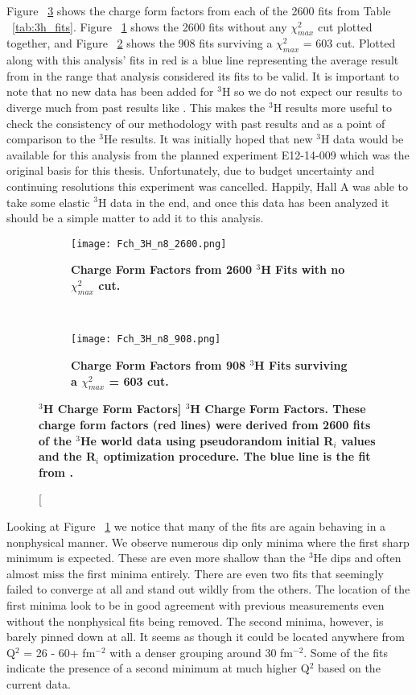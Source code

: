Figure ~\ref{fig:3h_fch} shows the charge form factors from each of the 2600 fits from Table ~\ref{tab:3h_fits}. Figure ~\ref{fig:3h_fch_no_cut} shows the 2600 fits without any $\chi^2_{max}$ cut plotted together, and Figure ~\ref{fig:3h_fch_cut} shows the 908 fits surviving a $\chi^2_{max}$ = 603 cut. Plotted along with this analysis' fits in red is a blue line representing the average result from \cite{Article:Amroun} in the range that analysis considered its fits to be valid. It is important to note that no new data has been added for $^3$H so we do not expect our results to diverge much from past results like \cite{Article:Amroun}. This makes the $^3$H results more useful to check the consistency of our methodology with past results and as a point of comparison to the $^3$He results. It was initially hoped that new $^3$H data would be available for this analysis from the planned experiment E12-14-009 \cite{3h_proposal} which was the original basis for this thesis. Unfortunately, due to budget uncertainty and continuing resolutions this experiment was cancelled. Happily, Hall A was able to take some elastic $^3$H data in the end, and once this data has been analyzed it should be a simple matter to add it to this analysis.

\begin{figure}[!ht]
\begin{subfigure}{1.\textwidth}
  \centering
  \texttt{[image: Fch\_3H\_n8\_2600.png]}
  \caption{\bf{Charge Form Factors from 2600 $^3$H Fits with no $\chi^2_{max}$ cut.}}
  \label{fig:3h_fch_no_cut}
\end{subfigure}\\
\begin{subfigure}{1.\textwidth}
  \centering
  \texttt{[image: Fch\_3H\_n8\_908.png]}
  \caption{\bf{Charge Form Factors from 908 $^3$H Fits surviving a $\chi^2_{max}$ = 603 cut.}}
  \label{fig:3h_fch_cut}
\end{subfigure}
\caption[\bf{$^3$H Charge Form Factors}] {
{\bf{$^3$H Charge Form Factors.}} These charge form factors (red lines) were derived from 2600 fits of the $^3$He world data using pseudorandom initial R$_i$ values and the R$_i$ optimization procedure. The blue line is the fit from \cite{Article:Amroun}.}
\label{fig:3h_fch}
\end{figure}

Looking at Figure ~\ref{fig:3h_fch_no_cut} we notice that many of the fits are again behaving in a nonphysical manner. We observe numerous dip only minima where the first sharp minimum is expected. These are even more shallow than the $^3$He dips and often almost miss the first minima entirely. There are even two fits that seemingly failed to converge at all and stand out wildly from the others. The location of the first minima look to be in good agreement with previous measurements even without the nonphysical fits being removed. The second minima, however, is barely pinned down at all. It seems as though it could be located anywhere from Q$^2$ = 26 - 60+ fm$^{-2}$ with a denser grouping around 30 fm$^{-2}$. Some of the fits indicate the presence of a second minimum at much higher Q$^2$ based on the current data. 


